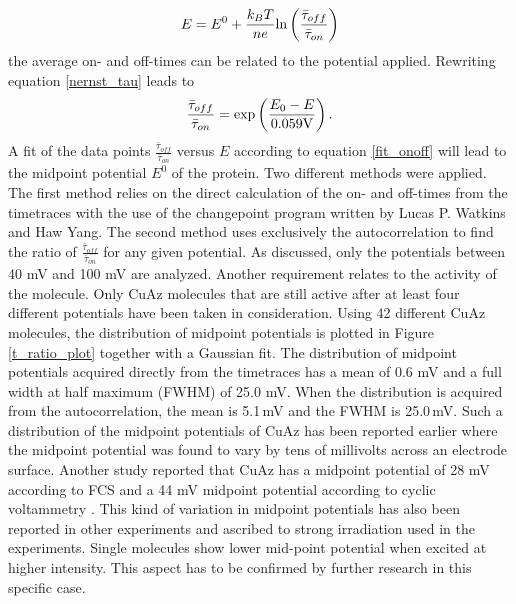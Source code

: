 \documentclass[twoside,single]{lion-msc}
\begin{document}
\begin{equation}\label{nernst_tau}
E = E^{0}+\frac{k_{B}T}{ne}\textup{ln}\left ( \frac{\bar{\tau}_{off}}{\bar{\tau}_{on}} \right )
\end{equation}
the average on- and off-times can be related to the potential applied. Rewriting equation \ref{nernst_tau} leads to
\begin{equation}\label{fit_onoff}
\frac{\bar{\tau}_{off}}{\bar{\tau}_{on}} = \textup{exp}\left ( \frac{E_{0}-E}{0.059\textup{V}} \right ).
\end{equation}
A fit of the data points $\frac{\bar{\tau}_{off}}{\bar{\tau}_{on}}$ versus $E$ according to equation \ref{fit_onoff} will lead to the midpoint potential $E^{0}$ of the protein. Two different methods were applied. The first method relies on the direct calculation of the on- and off-times from the timetraces with the use of the changepoint program written by  Lucas P. Watkins and Haw Yang. The second method uses exclusively the autocorrelation to find the ratio of  $\frac{\bar{\tau}_{off}}{\bar{\tau}_{on}}$ for any given potential. As discussed, only the potentials between 40 mV and 100 mV are analyzed. Another requirement relates to the activity of the molecule. Only CuAz molecules that are still active after at least four different potentials have been taken in consideration. Using 42 different CuAz molecules, the distribution of midpoint potentials is plotted in Figure \ref{t_ratio_plot} together with a Gaussian fit. The distribution of midpoint potentials acquired directly from the timetraces has a mean of 0.6 mV and a full width at half maximum (FWHM) of 25.0 mV. When the distribution is acquired from the autocorrelation, the mean is 5.1\,mV and the FWHM is 25.0\,mV. Such a distribution of the midpoint potentials of CuAz has been reported earlier \cite{Salverda2010} where the midpoint potential was found to vary by tens of millivolts across an electrode surface. Another study reported that CuAz has a midpoint potential of 28 mV according to FCS and a 44 mV midpoint potential according to cyclic voltammetry \cite{Patil2010}. This kind of variation in midpoint potentials has also been reported in other experiments \cite{Zhang2017} and ascribed to strong irradiation used in the experiments. Single molecules show lower mid-point potential when excited at higher intensity. This aspect has to be confirmed by further research in this specific case. 
\end{document}

